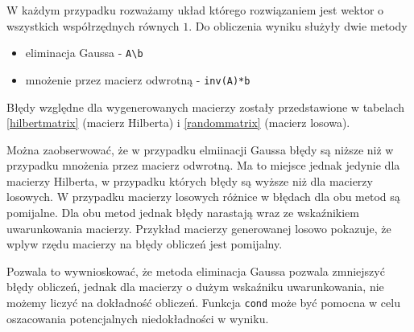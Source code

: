 \documentclass{article}
\begin{document}
W każdym przypadku rozważamy układ którego rozwiązaniem jest wektor o wszystkich współrzędnych równych $1$.
Do obliczenia wyniku służyły dwie metody
\begin{itemize}
  \item eliminacja Gaussa - \texttt{A\textbackslash b}
  \item mnożenie przez macierz odwrotną - \texttt{inv(A)*b}
\end{itemize}

Błędy względne dla wygenerowanych macierzy zostały przedstawione w tabelach \ref{hilbertmatrix} (macierz Hilberta) i \ref{randommatrix} (macierz losowa).

Można zaobserwować, że w przypadku elmiinacji Gaussa błędy są niższe niż w przypadku mnożenia przez macierz odwrotną.
Ma to miejsce jednak jedynie dla macierzy Hilberta, w przypadku których błędy są wyższe niż dla macierzy losowych.
W przypadku macierzy losowych różnice w błędach dla obu metod są pomijalne.
Dla obu metod jednak błędy narastają wraz ze wskaźnikiem uwarunkowania macierzy.
Przykład macierzy generowanej losowo pokazuje, że wplyw rzędu macierzy na błędy obliczeń jest pomijalny.

Pozwala to wywnioskować, że metoda eliminacja Gaussa pozwala zmniejszyć błędy obliczeń, jednak dla macierzy o dużym wskaźniku uwarunkowania, nie możemy liczyć na dokładność obliczeń.
Funkcja \texttt{cond} może być pomocna w celu oszacowania potencjalnych niedokładności w wyniku.
\end{document}
